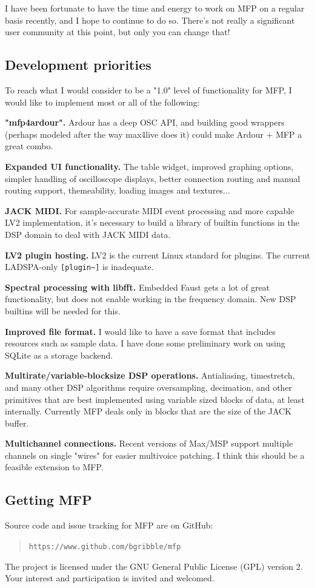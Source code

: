 \documentclass[a4paper]{article}
\begin{document}
I have been fortunate to have the time and energy to work on MFP
on a regular basis recently, and I hope to continue to do so.
There's not really a significant user community at this point,
but only you can change that!

\subsection{Development priorities}

To reach what I would consider to be a "1.0" level of
functionality for MFP, I would like to implement most or all of
the following:

{\bf "mfp4ardour".} Ardour has a deep OSC API, and building good
wrappers (perhaps modeled after the way max4live does it) could
make Ardour + MFP a great combo.

{\bf Expanded UI functionality.} The table widget, improved
graphing options, simpler handling of oscilloscope displays,
better connection routing and manual routing support, themeability,
loading images and textures...

{\bf JACK MIDI.} For sample-accurate MIDI event processing and
more capable LV2 implementation, it's necessary to build a
library of builtin functions in the DSP domain to deal with JACK
MIDI data.

{\bf LV2 plugin hosting.} LV2 is the current Linux standard for
plugins. The current LADSPA-only {\tt [plugin\textasciitilde]} is inadequate.

{\bf Spectral processing with libfft.} Embedded Faust gets a lot
of great functionality, but does not enable working in the
frequency domain. New DSP builtins will be needed for this.

{\bf Improved file format.} I would like to have a save format
that includes resources such as sample data. I have done some
preliminary work on using SQLite as a storage backend.

{\bf Multirate/variable-blocksize DSP operations.} Antialiasing,
timestretch, and many other DSP algorithms require oversampling,
decimation, and other primitives that are best implemented using
variable sized blocks of data, at least internally. Currently MFP
deals only in blocks that are the size of the JACK buffer.

{\bf Multichannel connections.} Recent versions of Max/MSP
support multiple channels on single "wires" for easier multivoice
patching. I think this should be a feasible extension to MFP.


\subsection{Getting MFP}

Source code and issue tracking for MFP are on GitHub:

\begin{quote}
\texttt{https://www.github.com/bgribble/mfp}
\end{quote}

The project is licensed under the GNU General Public License (GPL) version
2. Your interest and participation is invited and welcomed.

\nocite{*}


\end{document}
